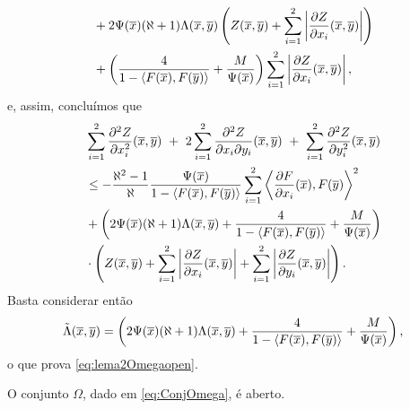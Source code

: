 \begin{demonstracao}
\begin{equation*}
\begin{aligned}
&+
2\Psi(\overline{x})(\aleph+1)\Lambda(\overline{x},\overline{y})\left(Z(\overline{x},\overline{y})
+\sum_{i=1}^2\left|\frac{\partial Z}{\partial x_i}(\overline{x},\overline{y})\right|\right) \\
&+\left(\frac{4}{1 - \langle F(\overline{x}), F(\overline{y}) \rangle} + \frac{M}{\Psi(\overline{x})}\right)
\sum_{i=1}^2\left|\frac{\partial Z}{\partial x_i}(\overline{x},\overline{y})\right|,
\end{aligned}
\end{equation*}
e, assim, conclu\'imos que
\begin{equation*}
\begin{aligned}
&\sum_{i=1}^2\frac{\partial^2 Z}{\partial x_i^2}(\xb,\yb) \ + \ 
2 \sum_{i=1}^2 \frac{\partial^2 Z}{\partial x_i \partial y_i}(\xb,\yb) \ + \ 
\sum_{i=1}^2 \frac{\partial^2 Z}{\partial y_i^2}(\xb,\yb)  \\
& \leq
- \frac{\aleph^2 - 1}{\aleph} \frac{\Psi(\xb)}{1 - \langle F(\xb), F(\yb) \rangle} \sum_{i=1}^2 \left\langle \frac{\partial F}{\partial x_i}(\xb), F(\yb) \right\rangle^2 \\
&+
\left(2\Psi(\xb)(\aleph+1)\Lambda(\xb,\yb) +
\frac{4}{1 - \langle F(\xb), F(\yb) \rangle} + \frac{M}{\Psi(\xb)}\right) \\
&\cdot\left( Z(\xb,\yb) + \sum_{i=1}^2 \left| \frac{\partial Z}{\partial x_i}(\xb,\yb) \right| + \sum_{i=1}^2 \left| \frac{\partial Z}{\partial y_i}(\xb,\yb) \right| \right).
\end{aligned}
\end{equation*}
Basta considerar ent\~ao
\[
\tilde\Lambda(\overline{x},\overline{y}) =
\left(2\Psi(\overline{x})(\aleph+1)\Lambda(\overline{x},\overline{y}) +
\frac{4}{1 - \langle F(\overline{x}), F(\overline{y}) \rangle} + \frac{M}{\Psi(\overline{x})}\right),
\]
o que prova \eqref{eq:lema2Omegaopen}.
\end{demonstracao}


\begin{lema}
O conjunto $\Omega$, dado em \eqref{eq:ConjOmega}, \'e aberto.
\end{lema}

